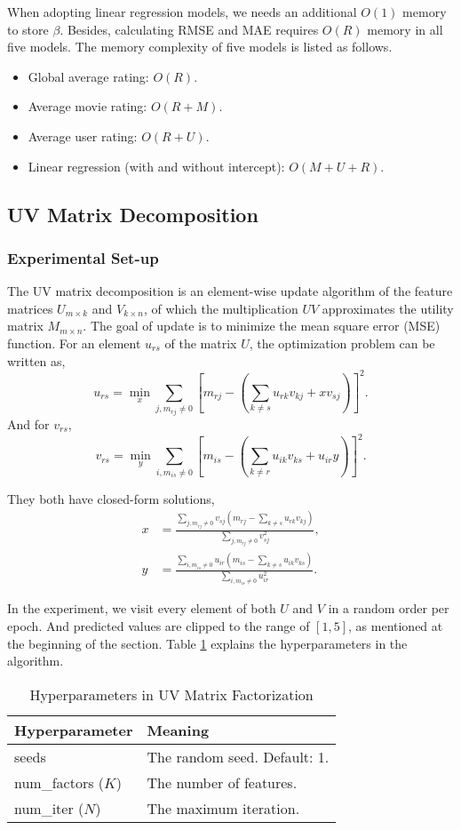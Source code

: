 \documentclass[12pt]{article}
\begin{document}
When adopting linear regression models, we needs an additional $O(1)$ memory to store $\beta$. Besides, calculating RMSE and MAE requires $O(R)$ memory in all five models. The memory complexity of five models is listed as follows.
\begin{itemize}
    \item Global average rating: $O(R)$.
    \item Average movie rating: $O(R + M)$.
    \item Average user rating: $O(R + U)$.
    \item Linear regression (with and without intercept): $O(M+U+R)$.
\end{itemize}

\subsection{UV Matrix Decomposition}
\subsubsection{Experimental Set-up}
The UV matrix decomposition is an element-wise update algorithm of the feature matrices $U_{m\times k}$ and $V_{k\times n}$, of which the multiplication $UV$ approximates the utility matrix $M_{m\times n}$. The goal of update is to minimize the mean square error (MSE) function. For an element $u_{rs}$ of the matrix $U$, the optimization problem can be written as,
\[
u_{rs} = \min_{x} \sum_{j, m_{rj}\neq 0}\left[ m_{rj}-\left( \sum_{k\neq s}u_{rk}v_{kj} + xv_{sj} \right) \right]^2.
\]
And for $v_{rs}$,
\[
v_{rs} = \min_{y} \sum_{i, m_{is}\neq 0}\left[ m_{is}-\left( \sum_{k\neq r}u_{ik}v_{ks} + u_{ir}y \right) \right]^2.
\]

They both have closed-form solutions,
\begin{align*}
x &= \frac{\sum\limits_{j, m_{rj}\neq 0}v_{sj}\left(m_{rj}-\sum\limits_{k\neq s }u_{rk}v_{kj}\right)}
{\sum\limits_{j, m_{rj}\neq 0}v_{sj}^2},\\
y &= \frac{\sum\limits_{i, m_{is}\neq 0}u_{ir}\left(m_{is}-\sum\limits_{k\neq s }u_{ik}v_{ks}\right)}
{\sum\limits_{i, m_{is}\neq 0}u_{ir}^2}. 
\end{align*}

In the experiment, we visit every element of both $U$ and $V$ in a random order per epoch. And predicted values are clipped to the range of $[1,5]$, as mentioned at the beginning of the section. Table \ref{tab:1.2-hyper} explains the hyperparameters in the algorithm.
\begin{table}[ht]
    \centering
    \caption{Hyperparameters in UV Matrix Factorization}
    \label{tab:1.2-hyper}
    \begin{tabular}{ll}
        \toprule
        \textbf{Hyperparameter} & \textbf{Meaning}\\
        \midrule
        seeds & The random seed. Default: 1.\\
        num\_factors ($K$) & The number of features.\\
        num\_iter ($N$) & The maximum iteration.\\
        \bottomrule
    \end{tabular}
\end{table}
\end{document}
